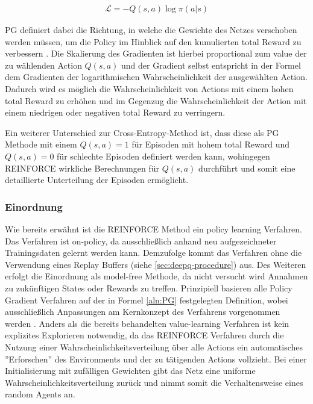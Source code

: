 \documentclass[11pt]{scrartcl}
\begin{document}
\begin{align}
\mathcal{L}=-Q(s,a)\log\pi(a|s)
\label{aln:PG}
\end{align}

PG definiert dabei die Richtung, in welche die Gewichte des Netzes verschoben werden müssen,
um die Policy im Hinblick auf den kumulierten total Reward zu verbessern \cite[~S.244]{L2018}.
Die Skalierung des Gradienten ist hierbei proportional zum value der zu wählenden Action
$Q(s,a)$ und der Gradient selbst entspricht in der Formel dem Gradienten der logarithmischen
Wahrscheinlichkeit der ausgewählten Action. Dadurch wird es möglich die Wahrscheinlichkeit
von Actions mit einem hohen total Reward zu erhöhen und im Gegenzug die Wahrscheinlichkeit
der Action mit einem niedrigen oder negativen total Reward zu verringern.

Ein weiterer Unterschied zur Cross-Entropy-Method ist, dass diese als PG Methode mit einem
$Q(s,a)=1$ für Episoden mit hohem total Reward und $Q(s,a)=0$ für schlechte Episoden
definiert werden kann, wohingegen REINFORCE wirkliche Berechnungen für $Q(s,a)$ durchführt
und somit eine detaillierte Unterteilung der Episoden ermöglicht.

\subsubsection{Einordnung}
Wie bereits erwähnt ist die REINFORCE Method ein policy learning Verfahren. Das Verfahren ist
on-policy, da ausschließlich anhand neu aufgezeichneter Trainingsdaten gelernt werden kann.
Demzufolge kommt das Verfahren ohne die Verwendung eines Replay Buffers (siehe 
\autoref{sec:deepq-procedure}) aus. Des Weiteren erfolgt die Einordnung als model-free Methode,
da nicht versucht wird Annahmen zu zukünftigen States oder Rewards zu treffen. Prinzipiell
basieren alle Policy Gradient Verfahren auf der in Formel \ref{aln:PG} festgelegten Definition,
wobei ausschließlich Anpassungen am Kernkonzept des Verfahrens vorgenommen werden
\cite[~S.244 f.]{L2018}. Anders als die bereits behandelten value-learning Verfahren ist
kein explizites Explorieren notwendig, da das REINFORCE Verfahren durch die Nutzung einer
Wahrscheinlichkeitsverteilung über alle Actions ein automatisches ''Erforschen'' 
des Environments und der zu tätigenden Actions vollzieht. Bei einer Initialisierung mit
zufälligen Gewichten gibt das Netz eine uniforme Wahrscheinlichkeitsverteilung zurück und nimmt
somit die Verhaltensweise eines random Agents an.
\end{document}

